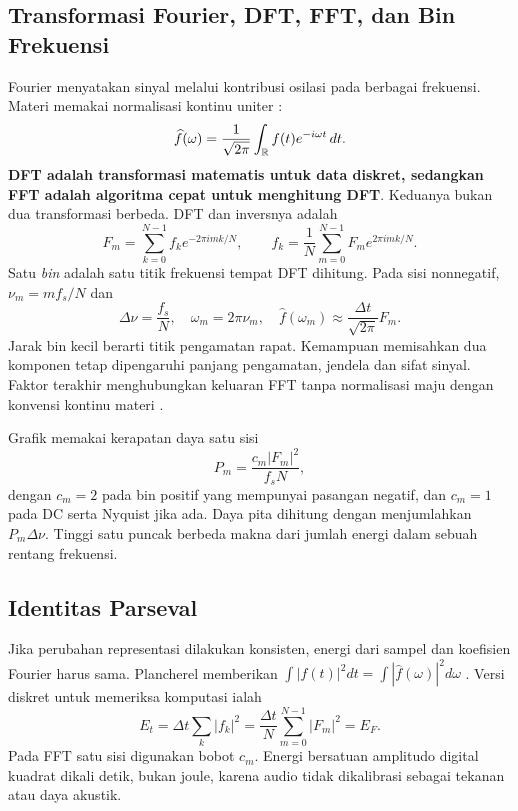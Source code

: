 \subsection{Transformasi Fourier, DFT, FFT, dan Bin Frekuensi}
Fourier menyatakan sinyal melalui kontribusi osilasi pada berbagai
frekuensi. Materi memakai normalisasi kontinu uniter \cite{kuliah4}:
\begin{equation}
 \widehat f(\omega)=\frac1{\sqrt{2\pi}}\int_{\mathbb R}f(t)e^{-i\omega t}\,dt.
 \label{eq:ft}
\end{equation}
\textbf{DFT adalah transformasi matematis untuk data diskret, sedangkan
FFT adalah algoritma cepat untuk menghitung DFT}. Keduanya bukan dua
transformasi berbeda. DFT dan inversnya adalah
\begin{equation}
 F_m=\sum_{k=0}^{N-1}f_ke^{-2\pi i mk/N},\qquad
 f_k=\frac1N\sum_{m=0}^{N-1}F_me^{2\pi i mk/N}.
 \label{eq:dft}
\end{equation}
Satu \textit{bin} adalah satu titik frekuensi tempat DFT dihitung.
Pada sisi nonnegatif, $\nu_m=mf_s/N$ dan
\begin{equation}
 \Delta\nu=\frac{f_s}{N},\quad \omega_m=2\pi\nu_m,\quad
 \widehat f(\omega_m)\approx\frac{\Delta t}{\sqrt{2\pi}}F_m.
 \label{eq:grid}
\end{equation}
Jarak bin kecil berarti titik pengamatan rapat. Kemampuan memisahkan
dua komponen tetap dipengaruhi panjang pengamatan, jendela dan sifat
sinyal. Faktor terakhir menghubungkan keluaran FFT tanpa normalisasi
maju dengan konvensi kontinu materi \cite{kuliah5,numpy}.

Grafik memakai kerapatan daya satu sisi
\begin{equation}
 P_m=\frac{c_m|F_m|^2}{f_sN},
 \label{eq:psd}
\end{equation}
dengan $c_m=2$ pada bin positif yang mempunyai pasangan negatif,
dan $c_m=1$ pada DC serta Nyquist jika ada. Daya pita dihitung dengan
menjumlahkan $P_m\Delta\nu$. Tinggi satu puncak berbeda makna dari
jumlah energi dalam sebuah rentang frekuensi.

\subsection{Identitas Parseval}
Jika perubahan representasi dilakukan konsisten, energi dari sampel
dan koefisien Fourier harus sama. Plancherel memberikan
$\int|f(t)|^2dt=\int|\widehat f(\omega)|^2d\omega$ \cite{kuliah4}.
Versi diskret untuk memeriksa komputasi ialah
\begin{equation}
 E_t=\Delta t\sum_k|f_k|^2
 =\frac{\Delta t}{N}\sum_{m=0}^{N-1}|F_m|^2=E_F.
 \label{eq:parseval}
\end{equation}
Pada FFT satu sisi digunakan bobot $c_m$. Energi bersatuan amplitudo
digital kuadrat dikali detik, bukan joule, karena audio tidak
dikalibrasi sebagai tekanan atau daya akustik.

